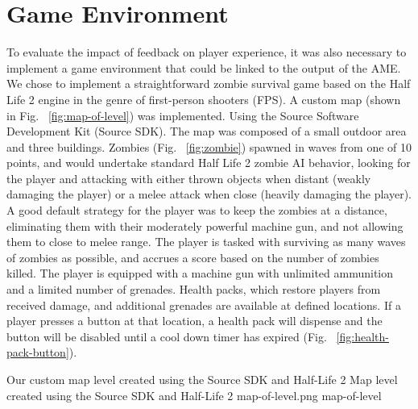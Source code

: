 

\section{Game Environment}

To evaluate the impact of feedback on player experience, it was also necessary to implement a game environment that could be linked to the output of the AME. We chose to implement a straightforward zombie survival game based on the Half Life 2 engine in the genre of first-person shooters (FPS). A custom map (shown in Fig. ~\ref{fig:map-of-level}) was implemented. Using the Source Software Development Kit (Source SDK). The map was composed of a small outdoor area and three buildings. Zombies (Fig. ~\ref{fig:zombie}) spawned in waves from one of 10 points, and would undertake standard Half Life 2 zombie AI behavior, looking for the player and attacking with either thrown objects when distant (weakly damaging the player) or a melee attack when close (heavily damaging the player). A good default strategy for the player was to keep the zombies at a distance, eliminating them with their moderately powerful machine gun, and not allowing them to close to melee range. The player is tasked with surviving as many waves of zombies as possible, and accrues a score based on the number of zombies killed. The player is equipped with a machine gun with unlimited ammunition and a limited number of grenades. Health packs, which restore players from received damage, and additional grenades are available at defined locations. If a player presses a button at that location, a health pack will dispense and the button will be disabled until a cool down timer has expired (Fig. ~\ref{fig:health-pack-button}).

\largeimg
{Our custom map level created using the Source SDK and Half-Life 2}
{Map level created using the Source SDK and Half-Life 2}
{map-of-level.png}
{map-of-level}

